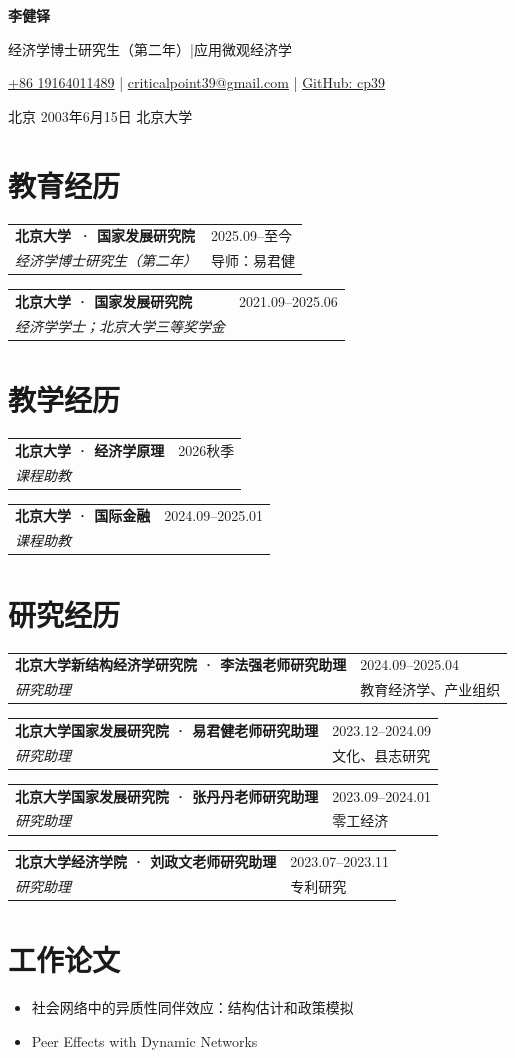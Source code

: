 \documentclass[10pt,a4paper,fontset=fandol]{ctexart}
\makeatletter
\newcommand{\ResumeName}{李健铎}
\newcommand{\Phone}{+86 19164011489}
\newcommand{\Email}{criticalpoint39@gmail.com}
\newcommand{\GithubID}{cp39}
\newcommand{\PhDInstitution}{北京大学}
\newcommand{\PhDSchool}{国家发展研究院}
\newcommand{\PhDStart}{2025.09}
\newcommand{\BachelorEnd}{2025.06}
\newcommand{\eduentry}[4]{%
  \begin{tabularx}{\textwidth}{@{}>{\raggedright\arraybackslash}X>{\raggedleft\arraybackslash}p{3.8cm}@{}}
    \textbf{#1} & \textcolor{Muted}{#2} \\
    \textit{#3} & \textcolor{Muted}{#4}
  \end{tabularx}\par\vspace{-0.18em}
}
\makeatother
\begin{document}
\begin{center}
  {\fontsize{24}{27}\selectfont\bfseries\color{Accent}\ResumeName}\par
  \vspace{0.16em}
  {\small 经济学博士研究生（第二年）\enspace\textcolor{Accent!60}{|}\enspace 应用微观经济学}\par
  \vspace{0.38em}
  {\small
    \href{tel:+8619164011489}{\Phone}
    \enspace\textcolor{Muted}{|}\enspace
    \href{mailto:\Email}{\Email}
    \enspace\textcolor{Muted}{|}\enspace
    \href{https://github.com/\GithubID}{GitHub: \GithubID}
  }\par
  \vspace{0.14em}
  {\small\textcolor{Muted}{北京 \enspace\textbar\enspace 2003年6月15日 \enspace\textbar\enspace \PhDInstitution}}
\end{center}

\vspace{-0.35em}
\section*{教育经历}
\eduentry{\PhDInstitution\ · \PhDSchool}{\PhDStart--至今}{经济学博士研究生（第二年）}{导师：易君健}
\eduentry{北京大学 · 国家发展研究院}{2021.09--\BachelorEnd}{经济学学士；北京大学三等奖学金}{}

\section*{教学经历}
\eduentry{北京大学 · 经济学原理}{2026秋季}{课程助教}{}
\eduentry{北京大学 · 国际金融}{2024.09--2025.01}{课程助教}{}

\section*{研究经历}
\eduentry{北京大学新结构经济学研究院 · 李法强老师研究助理}{2024.09--2025.04}{研究助理}{教育经济学、产业组织}
\eduentry{北京大学国家发展研究院 · 易君健老师研究助理}{2023.12--2024.09}{研究助理}{文化、县志研究}
\eduentry{北京大学国家发展研究院 · 张丹丹老师研究助理}{2023.09--2024.01}{研究助理}{零工经济}
\eduentry{北京大学经济学院 · 刘政文老师研究助理}{2023.07--2023.11}{研究助理}{专利研究}

\section*{工作论文}
\begin{itemize}
  \item 社会网络中的异质性同伴效应：结构估计和政策模拟
  \item Peer Effects with Dynamic Networks
\end{itemize}
\end{document}
